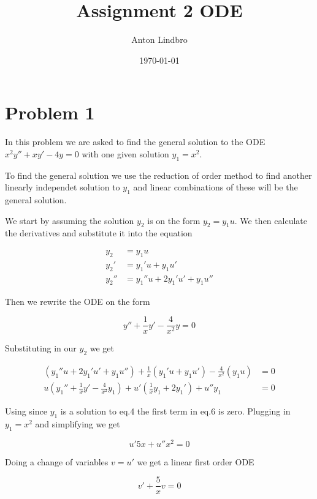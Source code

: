 \documentclass[a4paper]{article}
\title{Assignment 2 ODE}
\author{Anton Lindbro}
\date{\today}
\begin{document}
\maketitle

\section*{Problem 1}
In this problem we are asked to find the general solution to the ODE $x^2y'' + xy' - 4y = 0$ with one given solution $y_1=x^2$.

To find the general solution we use the reduction of order method to find another linearly independet solution to $y_1$ and linear combinations of these will be the general solution. 

We start by assuming the solution $y_2$ is on the form $y_2=y_1u$. We then calculate the derivatives and substitute it into the equation

\begin{align}
    y_2 &= y_1u\\
    y_2' &= y_1'u + y_1 u'\\
    y_2'' &= y_1''u + 2y_1'u' + y_1u'' 
\end{align}

Then we rewrite the ODE on the form

\begin{equation}
    y'' + \frac{1}{x}y' - \frac{4}{x^2}y = 0
\end{equation}

Substituting in our $y_2$ we get

\begin{align}
    (y_1''u + 2y_1'u' + y_1u'') + \frac{1}{x}(y_1'u + y_1 u') - \frac{4}{x^2}(y_1u) &= 0\\
    u(y_1'' + \frac{1}{x}y' - \frac{4}{x^2}y_1) + u'(\frac{1}{x}y_1 + 2y_1') + u''y_1 &= 0
\end{align}

Using since $y_1$ is a solution to eq.4 the first term in eq.6 is zero. Plugging in $y_1 = x^2$ and simplifying we get

\begin{equation}
    u'5x + u''x^2 = 0
\end{equation}

Doing a change of variables $v = u'$ we get a linear first order ODE

\begin{equation}
    v' + \frac{5}{x}v = 0
\end{equation}
\end{document}
